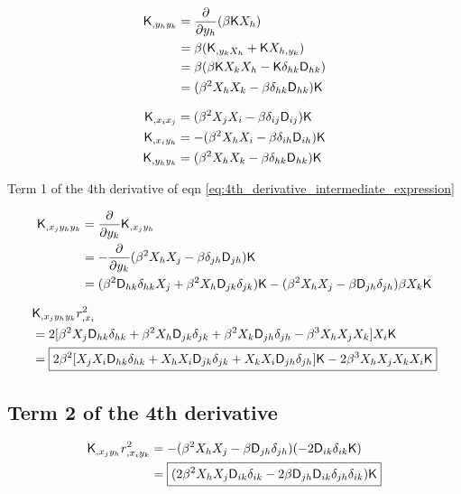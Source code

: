 \begin{align*}
\mathsf{K}_{,y_h y_k} &= \frac{\partial}{\partial y_h} (\beta \mathsf{K} X_h)\\
&= \beta(\mathsf{K}_{,y_k X_h} + \mathsf{K} X_{h, y_k})\\ 
&= \beta(\beta \mathsf{K} X_k X_h - \mathsf{K} \delta_{hk} \mathsf{D}_{hk}) \\ 
&= (\beta^2 X_h X_k - \beta \delta_{hk} \mathsf{D}_{hk})\mathsf{K} 
\end{align*}

\begin{align}
\mathsf{K}_{,x_i x_j} &= (\beta^2 X_j X_i - \beta \delta_{ij} \mathsf{D}_{ij})\mathsf{K}\\ 
\mathsf{K}_{,x_i y_h} &= -(\beta^2 X_h X_i - \beta \delta_{ih} \mathsf{D}_{ih})\mathsf{K}\\ 
\mathsf{K}_{,y_h y_k} &= (\beta^2 X_h X_k - \beta \delta_{hk} \mathsf{D}_{hk})\mathsf{K} 
\end{align}

Term 1 of the 4th derivative of eqn \ref{eq:4th_derivative_intermediate_expression}

\begin{align*}
\mathsf{K}_{,x_j y_h y_k}
&= \frac{\partial}{\partial y_k} \mathsf{K}_{,x_j y_h}\\ 
&= -\frac{\partial}{\partial y_k} (\beta^2 X_h X_j - \beta \delta_{jh} \mathsf{D}_{jh})\mathsf{K}\\
&= (\beta^2 \mathsf{D}_{hk} \delta_{hk} X_j + \beta^2 X_h \mathsf{D}_{jk}\delta_{jk})\mathsf{K} -
(\beta^2 X_h X_j - \beta \mathsf{D}_{jh} \delta_{jh})\beta X_k \mathsf{K}
\end{align*}

\begin{align*}
&\mathsf{K}_{,x_j y_h y_k} r_{,x_i}^2\\
&= 2[\beta^2 X_j \mathsf{D}_{hk} \delta_{hk} + \beta^2 X_h \mathsf{D}_{jk}\delta_{jk} +
\beta^2 X_k \mathsf{D}_{jh} \delta_{jh} - \beta^3 X_h X_j X_k] X_i \mathsf{K}\\ 
&=\boxed{2\beta^2[ 
X_j X_i \mathsf{D}_{hk} \delta_{hk} + 
X_h X_i \mathsf{D}_{jk} \delta_{jk} + 
X_k X_i \mathsf{D}_{jh} \delta_{jh}] \mathsf{K} 
- 2\beta^3 X_h X_j X_k X_i \mathsf{K}} 
\end{align*}

\subsection{Term 2 of the 4th derivative}
\begin{align*}
\mathsf{K}_{,x_j y_h} r^2_{,x_i y_k}
&= - (\beta^2 X_h X_j - \beta \mathsf{D}_{jh} \delta_{jh}) (-2\mathsf{D}_{ik}
\delta_{ik} \mathsf{K}) \\  
&= \boxed{( 2 \beta^2  X_h X_j \mathsf{D}_{ik} \delta_{ik} 
-2 \beta \mathsf{D}_{jh} \mathsf{D}_{ik} \delta_{jh} \delta_{ik}) \mathsf{K}} 
\end{align*}

